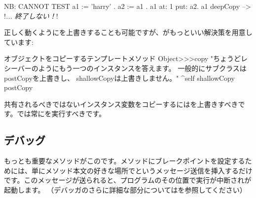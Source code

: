 \documentclass[a4paper,10pt,twoside]{book}
\begin{document}
\begin{code}{NB: CANNOT TEST}
a1 := { 'harry' }.
a2 := { a1 }.
a1 at: 1 put: a2.
a1 deepCopy --> !\emph{... 終了しない！}!
\end{code}

正しく動くようにを上書きすることも可能ですが、がもっといい解決策を用意しています:

\begin{method}{オブジェクトをコピーするテンプレートメソッド}
Object>>>copy
    "ちょうどレシーバーのようにもう一つのインスタンスを答えます。
    一般的にサブクラスはpostCopyを上書きし、
    shallowCopyは上書きしません。"
    ^self shallowCopy postCopy
\end{method}

共有されるべきではないインスタンス変数をコピーするにはを上書きすべきです。では常にを実行すべきです。


\subsection{デバッグ}

もっとも重要なメソッドがこのです。メソッドにブレークポイントを設定するためには、単にメソッド本文の好きな場所でというメッセージ送信を挿入するだけです。このメッセージが送られると、プログラムのその位置で実行が中断されが起動します。
（デバッガのさらに詳細な部分についてはを参照してください）
\end{document}
